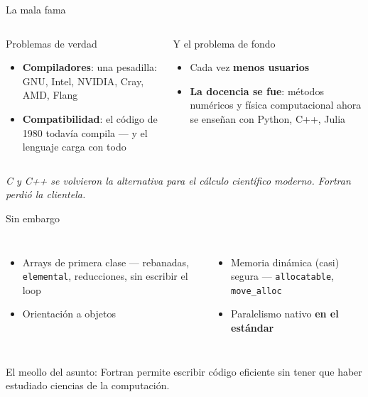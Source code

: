 \documentclass[aspectratio=169]{beamer}
\begin{document}
\begin{frame}{La mala fama}
  \vspace{.5em}
  \begin{columns}[T,onlytextwidth]
      \begin{alertblock}{Problemas de verdad}
        \begin{itemize}\setlength\itemsep{2pt}
          \item \textbf{Compiladores}: una pesadilla: GNU, Intel, NVIDIA, Cray, AMD, Flang
          \item \textbf{Compatibilidad}: el código de 1980 todavía compila --- y el lenguaje carga con todo
        \end{itemize}
      \end{alertblock}
      \begin{alertblock}{Y el problema de fondo}
        \begin{itemize}\setlength\itemsep{2pt}
          \item Cada vez \textbf{menos usuarios}
          \item \textbf{La docencia se fue}: métodos numéricos y física computacional
            ahora se enseñan con Python, C++, Julia
        \end{itemize}
      \end{alertblock}
  \end{columns}
  \vspace{.4em}
  {\footnotesize\itshape C y C++ se volvieron la alternativa para el cálculo científico moderno.
  Fortran perdió la clientela.}
\end{frame}

\begin{frame}{Sin embargo}
  \begin{columns}[T,onlytextwidth]
      \begin{itemize}\setlength\itemsep{3pt}
        \item Arrays de primera clase --- rebanadas, \texttt{elemental}, reducciones, sin escribir el loop 
        \item Orientación a objetos 
      \end{itemize}
      \begin{itemize}\setlength\itemsep{3pt}
        \item Memoria dinámica (casi) segura --- \texttt{allocatable}, \texttt{move\_alloc}
        \item Paralelismo nativo \textbf{en el estándar} 
      \end{itemize}
  \end{columns}
  \vfill
  \begin{exampleblock}{El meollo del asunto:}
    \centering Fortran permite escribir código eficiente sin tener que haber estudiado ciencias de la computación.
  \end{exampleblock}
\end{frame}
\end{document}
